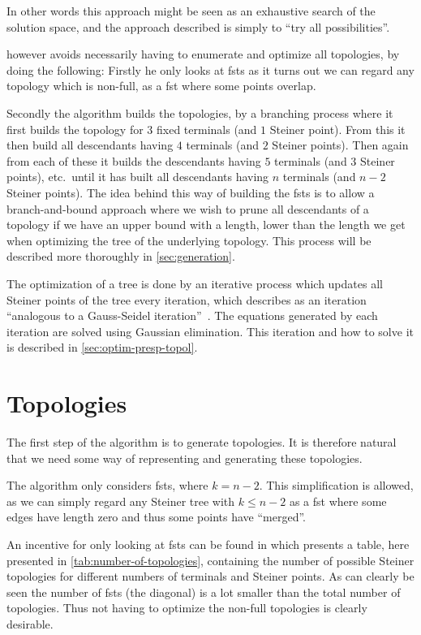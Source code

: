 In other words this approach might be seen as an exhaustive search of the
solution space, and the approach described is simply to ``try all
possibilities''.

\citeauthor{smith1992} however avoids necessarily having to enumerate and optimize all
topologies, by doing the following: Firstly he only looks at \acp{fst} as it
turns out we can regard any topology which is non-full, as a \ac{fst} where
some points overlap.

Secondly the algorithm builds the topologies, by a branching process where it
first builds the topology for $3$ fixed terminals (and $1$ Steiner point). From
this it then build all descendants having $4$ terminals (and $2$ Steiner
points). Then again from each of these it builds the descendants having $5$
terminals (and $3$ Steiner points), etc.\, until it has built all descendants
having $n$ terminals (and $n-2$ Steiner points). The idea behind this way of
building the \acp{fst} is to allow a branch-and-bound approach where we wish to
prune all descendants of a topology if we have an upper bound with a length,
lower than the length we get when optimizing the tree of the underlying
topology.  This process will be described more thoroughly in
\cref{sec:generation}.

The optimization of a tree is done by an iterative process which updates all
Steiner points of the tree every iteration, which \citeauthor{smith1992}
describes as an iteration ``analogous to a Gauss-Seidel
iteration''~\cite[p.~145]{smith1992}. The equations generated by each iteration
are solved using Gaussian elimination. This iteration and how to solve it is
described in \cref{sec:optim-presp-topol}.

\section{Topologies}
\label{sec:topologies}

The first step of the algorithm is to generate topologies. It is therefore
natural that we need some way of representing and generating these topologies.

The algorithm only considers \acp{fst}, where $k = n - 2$. This simplification
is allowed, as we can simply regard any Steiner tree with $k \le n - 2$ as a
\ac{fst} where some edges have length zero and thus some points have
``merged''.

An incentive for only looking at \acp{fst} can be found in \textcite{gilbert1968}
which presents a table, here presented in \cref{tab:number-of-topologies},
containing the number of possible Steiner topologies for different numbers of
terminals and Steiner points. As can clearly be seen the number of \acp{fst}
(the diagonal) is a lot smaller than the total number of topologies. Thus not
having to optimize the non-full topologies is clearly desirable.

